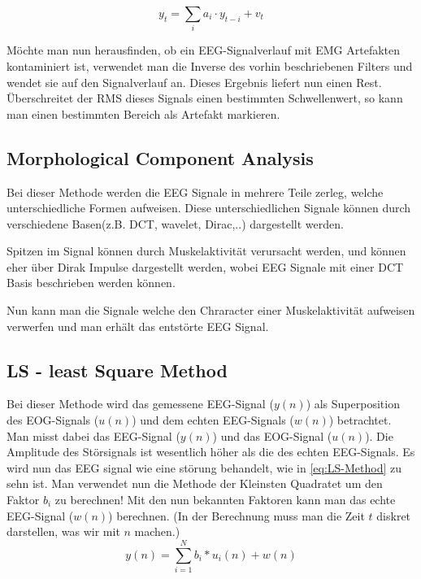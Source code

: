 \documentclass[preprint,12pt]{elsarticle}
\begin{document}
\begin{equation}
y_t = \sum_i a_i \cdot y_{t-i} + v_t
\end{equation}

Möchte man nun herausfinden, ob ein EEG-Signalverlauf mit EMG Artefakten kontaminiert ist, verwendet man die Inverse
des vorhin beschriebenen Filters und wendet sie auf den Signalverlauf an. Dieses Ergebnis liefert nun einen Rest.
Überschreitet der RMS dieses Signals einen bestimmten Schwellenwert, so kann man einen bestimmten Bereich als Artefakt markieren.
~\cite{Pfurtscheller2007}

\subsection{Morphological Component Analysis}

Bei dieser Methode werden die EEG Signale in mehrere Teile zerleg, welche unterschiedliche Formen aufweisen.
Diese unterschiedlichen Signale können durch verschiedene Basen(z.B. DCT, wavelet, Dirac,..) dargestellt werden.

Spitzen im Signal können durch Muskelaktivität verursacht werden, und können eher über Dirak Impulse dargestellt
werden, wobei EEG Signale mit einer DCT Basis beschrieben werden können.

Nun kann man die Signale welche den Chraracter einer Muskelaktivität aufweisen verwerfen und man erhält das entstörte EEG Signal.
\cite{Yong2009}


\subsection{LS - least Square Method}

Bei dieser Methode wird das gemessene EEG-Signal ($y(n)$) als Superposition des EOG-Signals ($u(n)$) und dem echten EEG-Signals
 ($w(n)$) betrachtet. Man misst dabei das EEG-Signal ($y(n)$) und das EOG-Signal ($u(n)$). Die Amplitude des Störsignals ist wesentlich höher als die des
 echten EEG-Signals. Es wird nun das EEG signal wie eine störung behandelt, wie in \ref{eq:LS-Method} zu sehn ist. Man verwendet nun die Methode der Kleinsten
 Quadratet um den Faktor $b_i$ zu berechnen! Mit den nun bekannten Faktoren kann man das echte EEG-Signal ($w(n)$) berechnen.
(In der Berechnung muss man die Zeit $t$ diskret darstellen, was wir mit $n$  machen.)~\cite{Thulasidas2004}
\begin{equation} \label{eq:LS-Method}
 y(n) =  \sum_{i=1}^{N} b_i * u_i(n) + w(n)
\end{equation}
\end{document}
